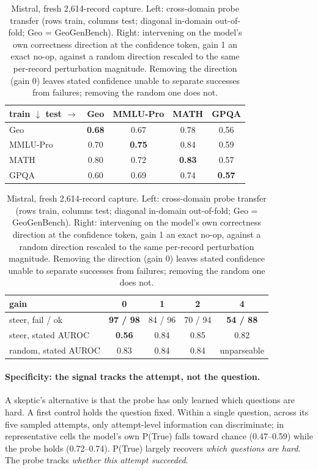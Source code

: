 \documentclass{article}
\begin{document}
\begin{table}[t]
\caption{Mistral, fresh 2,614-record capture. Left: cross-domain probe transfer (rows train, columns test; diagonal in-domain out-of-fold; Geo = GeoGenBench). Right: intervening on the model's own correctness direction at the confidence token, gain 1 an exact no-op, against a random direction rescaled to the same per-record perturbation magnitude. Removing the direction (gain 0) leaves stated confidence unable to separate successes from failures; removing the random one does not.}
\label{tab:transfer}
\centering
\small
\begin{tabular}{lcccc}
\toprule
\textbf{train $\downarrow$ test $\rightarrow$} & \textbf{Geo} & \textbf{MMLU-Pro} & \textbf{MATH} & \textbf{GPQA} \\
\midrule
Geo & \textbf{0.68} & 0.67 & 0.78 & 0.56 \\
MMLU-Pro & 0.70 & \textbf{0.75} & 0.84 & 0.59 \\
MATH & 0.80 & 0.72 & \textbf{0.83} & 0.57 \\
GPQA & 0.60 & 0.69 & 0.74 & \textbf{0.57} \\
\bottomrule
\end{tabular}
\hspace{1.5em}
\begin{tabular}{lcccc}
\toprule
\textbf{gain} & \textbf{0} & \textbf{1} & \textbf{2} & \textbf{4} \\
\midrule
steer, fail / ok & \textbf{97 / 98} & 84 / 96 & 70 / 94 & \textbf{54 / 88} \\
steer, stated AUROC & \textbf{0.56} & 0.84 & 0.85 & 0.82 \\
random, stated AUROC & 0.83 & 0.84 & 0.84 & unparseable \\
\bottomrule
\end{tabular}
\end{table}

\paragraph{Specificity: the signal tracks the attempt, not the question.}
A skeptic's alternative is that the probe has only learned which questions are hard.
A first control holds the question fixed.
Within a single question, across its five sampled attempts, only attempt-level information can discriminate; in representative cells the model's own P(True) falls toward chance (0.47--0.59) while the probe holds (0.72--0.74).
P(True) largely recovers \emph{which questions are hard}.
The probe tracks \emph{whether this attempt succeeded}.
\end{document}
